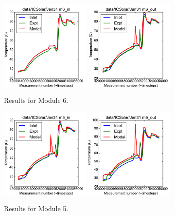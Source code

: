 \documentclass{article}
\begin{document}
\begin{figure}[!ht]
\centering
\includegraphics[width=0.4\textwidth]{../../data/ICSolar/images/Jan31_m6_in_unsteady.pdf}\hspace{0.05\textwidth}
\includegraphics[width=0.4\textwidth]{../../data/ICSolar/images/Jan31_m6_out_unsteady.pdf}\hspace{0.05\textwidth}\\
\caption{Results for Module 6.}\end{figure}
\begin{figure}[!ht]
\centering
\includegraphics[width=0.4\textwidth]{../../data/ICSolar/images/Jan31_m5_in_unsteady.pdf}\hspace{0.05\textwidth}
\includegraphics[width=0.4\textwidth]{../../data/ICSolar/images/Jan31_m5_out_unsteady.pdf}\hspace{0.05\textwidth}\\
\caption{Results for Module 5.}\end{figure}
\end{document}
